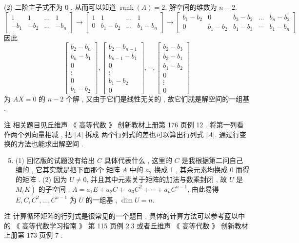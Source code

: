 \documentclass[10pt]{article}
\begin{document}
(2)  二阶主子式不为  0 ,  从而可以知道  $\operatorname{rank}(A)=2$,  解空间的维数为  $n-2$.
$$
\left[\begin{array}{cccc}
1 & 1 & \ldots & 1 \\
-b_{1} & -b_{2} & \ldots & -b_{n}
\end{array}\right] \rightarrow\left[\begin{array}{ccccc}
1 & 1 & \ldots & 1 \\
0 & b_{1}-b_{2} & \ldots & b_{1}-b_{n}
\end{array}\right] \rightarrow\left[\begin{array}{ccccc}
b_{1}-b_{2} & 0 & b_{3}-b_{2} & \ldots & b_{n}-b_{2} \\
0 & b_{1}-b_{2} & b_{1}-b_{3} & \cdots & b_{1}-b_{n}
\end{array}\right]
$$
 因此 
$$
\left[\begin{array}{c}
b_{2}-b_{n} \\
b_{n}-b_{1} \\
0 \\
\vdots \\
0 \\
b_{1}-b_{2}
\end{array}\right],\left[\begin{array}{c}
b_{2}-b_{n-1} \\
b_{n-1}-b_{1} \\
0 \\
\vdots \\
b_{1}-b_{2} \\
0
\end{array}\right], \cdots,\left[\begin{array}{c}
b_{2}-b_{3} \\
b_{3}-b_{1} \\
b_{1}-b_{2} \\
0 \\
\vdots \\
0
\end{array}\right]
$$
 为  $A X=0$  的  $n-2$  个解 ,  又由于它们是线性无关的 ,  故它们就是解空间的一组基 .

 注   相关题目见丘维声 《 高等代数 》 创新教材上册第  176  页例  12 .  将第一列看作两个列向量相减 ,  把  $|A|$  拆成   两个行列式的差也可以算出行列式  $|A|$.  通过行变换的方法也能求出解空间 .

\begin{enumerate}
  \setcounter{enumi}{4}
  \item (1)  回忆版的试题没有给出  $C$  具体代表什么 ,  这里的  $C$  是我根据第二问自己编的 ,  它其实就是把下面那个   矩阵  $A$  中的  $a_{2}$  换成  1 ,  其余元素均换成  0  而得的矩阵 . (2)  因为  $U \neq 0$,  并且其中元素关于矩阵的加法与数乘封闭 ,  故  $U$  是  $\left.M_{(} K\right)$  的子空间 . $A=a_{1} E+a_{2} C+$ $a_{3} C^{2}+\cdots+a_{n} C^{n-1}$,  由此易得  $E, C, C^{2}, \ldots, C^{n-1}$  为  $U$  的一组基 , $\operatorname{dim} U=n$.
\end{enumerate}
 注   计算循环矩阵的行列式是很常见的一个题目 ,  具体的计算方法可以参考蓝以中的 《 高等代数学习指南 》 第  115  页例  $2.3$  或者丘维声  《 高等代数 》 创新教材上册第  173  页例  7 .
\end{document}
